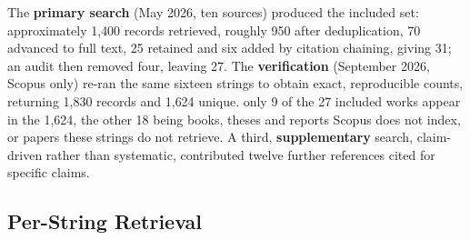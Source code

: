 \documentclass[conference]{IEEEtran}
\begin{document}
The \textbf{primary search} (May 2026, ten sources) produced the included set:
approximately 1{,}400 records retrieved, roughly 950 after deduplication, 70
advanced to full text, 25 retained and six added by citation chaining, giving 31;
an audit then removed four, leaving 27. The \textbf{verification} (September
2026, Scopus only) re-ran the same sixteen strings to obtain exact, reproducible
counts, returning 1{,}830 records and 1{,}624 unique. only 9 of the 27 included works appear in the 1{,}624, the
other 18 being books, theses and reports Scopus does not index, or papers these
strings do not retrieve. A third, \textbf{supplementary} search, claim-driven
rather than systematic, contributed twelve further references cited for
specific claims.

\subsection{Per-String Retrieval}
\end{document}
